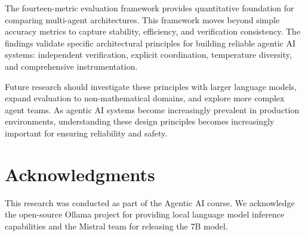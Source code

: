 \documentclass[conference]{IEEEtran}
\begin{document}
The fourteen-metric evaluation framework provides quantitative foundation for comparing multi-agent architectures. This framework moves beyond simple accuracy metrics to capture stability, efficiency, and verification consistency. The findings validate specific architectural principles for building reliable agentic AI systems: independent verification, explicit coordination, temperature diversity, and comprehensive instrumentation.

Future research should investigate these principles with larger language models, expand evaluation to non-mathematical domains, and explore more complex agent teams. As agentic AI systems become increasingly prevalent in production environments, understanding these design principles becomes increasingly important for ensuring reliability and safety.

\section*{Acknowledgments}

This research was conducted as part of the Agentic AI course. We acknowledge the open-source Ollama project for providing local language model inference capabilities and the Mistral team for releasing the 7B model.
\end{document}
